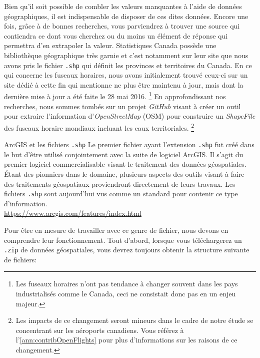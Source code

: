 Bien qu'il soit possible de combler les valeurs manquantes à l'aide de données géographiques, il est indispensable de disposer de ces dites données. Encore une fois, grâce à de bonnes recherches, vous parviendrez à trouver une source qui contiendra ce dont vous cherchez ou du moins un élément de réponse qui permettra d'en extrapoler la valeur. Statistiques Canada possède une bibliothèque géographique très garnie et c'est notamment sur leur site que nous avons pris le fichier \texttt{.shp} qui définit les provinces et territoires du Canada. \cite{data:StatCan:boundariesCanada} En ce qui concerne les fuseaux horaires, nous avons initialement trouvé ceux-ci sur un site \cite{data:efele:timezone} dédié à cette fin qui mentionne ne plus être maintenu à jour, mais dont la dernière mise à jour a été faite le 28 mai 2016. \footnote{Les fuseaux horaires n'ont pas tendance à changer souvent dans les pays industrialisés comme le Canada, ceci ne consistait donc pas en un enjeu majeur.} En approfondissant nos recherches, nous sommes tombés sur un projet \emph{GitHub} visant à 
créer un outil pour extraire l'information d'\emph{OpenStreetMap} (OSM) pour construire un \emph{ShapeFile} des fuseaux horaire mondiaux incluant les eaux territoriales. \cite{timezone-boundary-builder} \footnote{Les impacts de ce changement seront mineurs dans le cadre de notre étude se concentrant sur les aéroports canadiens. Vous référez à l'\autoref{ann:contribOpenFlights} pour plus d'informations sur les raisons de ce changement.} \\

\begin{moreInfo}{ArcGIS et les fichiers \texttt{.shp}}
	Le premier fichier ayant l'extension \texttt{.shp} fut créé dans le but d'être utilisé conjointement avec la suite de logiciel ArcGIS. Il s'agit du premier logiciel commercialisable visant le traitement des données géospatiales. Étant des pionniers dans le domaine, plusieurs aspects des outils visant à faire des traitements géospatiaux proviendront directement de leurs travaux. Les fichiers \texttt{.shp} sont aujourd'hui vus comme un standard pour contenir ce type d'information. \\
\url{https://www.arcgis.com/features/index.html}
\end{moreInfo}

Pour être en mesure de travailler avec ce genre de fichier, nous devons en comprendre leur fonctionnement. Tout d'abord, lorsque vous téléchargerez un \texttt{.zip} de données géospatiales, vous devrez toujours obtenir la structure suivante de fichiers: \\

